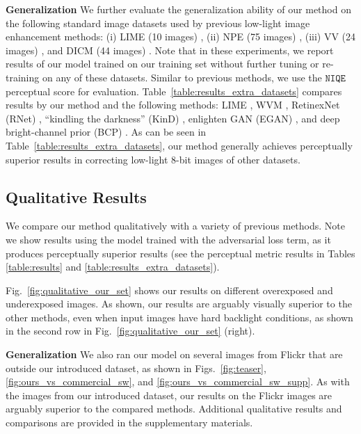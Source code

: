 \documentclass[final]{cvpr}
\begin{document}
\noindent\textbf{Generalization} We further evaluate the generalization ability of our method on the following standard image datasets used by previous low-light image enhancement methods: (i)  LIME (10 images) \cite{guo2017lime}, (ii)  NPE (75 images) \cite{wang2013naturalness}, (iii)  VV (24 images) \cite{VVDataset}, and  DICM (44 images) \cite{lee2012contrast}. Note that in these experiments, we report results of our model trained on our training set without further tuning or re-training on any of these datasets. Similar to previous methods, we use the $\texttt{NIQE}$ perceptual score \cite{mittal2012making} for evaluation. Table\ \ref{table:results_extra_datasets} compares results by our method and the following methods: LIME \cite{guo2016lime, guo2017lime}, WVM \cite{fu2016weighted}, RetinexNet (RNet) \cite{Chen2018Retinex}, ``kindling the darkness'' (KinD) \cite{zhang2019kindling}, enlighten GAN (EGAN) \cite{jiang2019enlightengan}, and deep bright-channel prior (BCP) \cite{8955834}. As can be seen in Table\ \ref{table:results_extra_datasets}, our method generally achieves perceptually superior results in correcting low-light 8-bit images of other datasets.













\subsection{Qualitative Results}\label{subsec:qual-results}

We compare our method qualitatively with a variety of previous methods. Note we show results using the model trained with the adversarial loss term, as it produces perceptually superior results (see the perceptual metric results in Tables \ref{table:results} and \ref{table:results_extra_datasets}).


Fig.~\ref{fig:qualitative_our_set} shows our results on different overexposed and underexposed images. As shown, our results are arguably visually superior to the other methods, even when input images have hard backlight conditions, as shown in the second row in Fig.~\ref{fig:qualitative_our_set} (right).

\noindent\textbf{Generalization} We also ran our model on several images from Flickr that are outside our introduced dataset, as shown in Figs.\ \ref{fig:teaser}, \ref{fig:ours_vs_commercial_sw}, and  \ref{fig:ours_vs_commercial_sw_supp}.  As with the images from our introduced dataset, our results on the Flickr images are arguably superior to the compared methods. Additional qualitative results and comparisons are provided in the supplementary materials.
\end{document}
